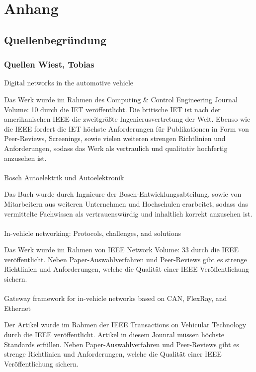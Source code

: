 \section{Anhang}

\subsection{Quellenbegründung}

\subsubsection{Quellen Wiest, Tobias}

Digital networks in the automotive vehicle \cite{leen1999digital}

Das Werk wurde im Rahmen des Computing \& Control Engineering Journal Volume: 10 durch die IET veröffentlicht. Die britische IET ist nach der amerikanischen IEEE die zweitgrößte Ingenierusvertretung der Welt. Ebenso wie die IEEE fordert die IET höchste Anforderungen für Publikationen in Form von Peer-Reviews, Screenings, sowie vielen weiteren strengen Richtlinien und Anforderungen, sodass das Werk als vertraulich und qualitativ hochfertig anzusehen ist.\\\\

Bosch Autoelektrik und Autoelektronik \cite{reif2011bosch}

Das Buch wurde durch Ingnieure der Bosch-Entwicklungsabteilung, sowie von Mitarbeitern aus weiteren Unternehmen und Hochschulen erarbeitet, sodass das vermittelte Fachwissen als vertrauenswürdig und inhaltlich korrekt anzusehen ist.\\\\

In-vehicle networking: Protocols, challenges, and solutions \cite{TW_huang2018vehicle}

Das Werk wurde im Rahmen von IEEE Network Volume: 33 durch die IEEE veröffentlicht.
Neben Paper-Auswahlverfahren und Peer-Reviews gibt es strenge Richtlinien und Anforderungen, welche die Qualität einer IEEE Veröffentlichung sichern.\\\\

Gateway framework for in-vehicle networks based on CAN, FlexRay, and Ethernet \cite{TW_kim2014gateway}

Der Artikel wurde im Rahmen der IEEE Transactions on Vehicular Technology durch die IEEE veröffentlicht. Artikel in diesem Jounral müssen höchste Standards erfüllen. Neben Paper-Auswahlverfahren und Peer-Reviews gibt es strenge Richtlinien und Anforderungen, welche die Qualität einer IEEE Veröffentlichung sichern.\\\\

